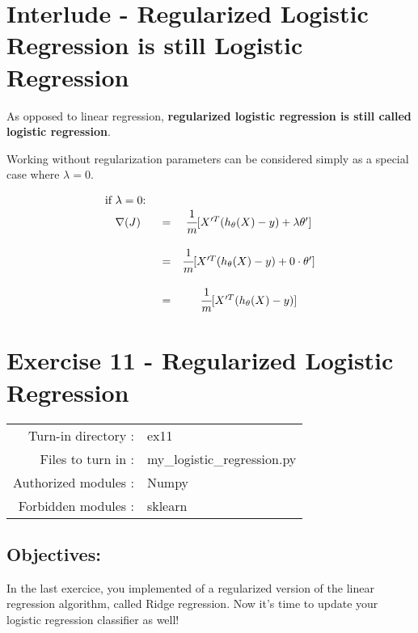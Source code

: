 \documentclass[]{article}
\begin{document}
\hypertarget{interlude---regularized-logistic-regression-is-still-logistic-regression-1}{%
\section{Interlude - Regularized Logistic Regression is still Logistic
Regression}\label{interlude---regularized-logistic-regression-is-still-logistic-regression-1}}

As opposed to linear regression, \textbf{regularized logistic regression
is still called logistic regression}.

Working without regularization parameters can be considered simply as a
special case where \(\lambda = 0\).

\large

\[
\begin{matrix}
\text{if } \lambda = 0 \text{: }\\
\nabla(J) & = & \cfrac{1}{m} [X'^T(h_\theta(X) - y) + \lambda \theta'] \\
\\
& = & \cfrac{1}{m} [X'^T(h_\theta(X) - y) + 0 \cdot \theta'] \\
\\
& = & \cfrac{1}{m} [X'^T(h_\theta(X) - y)]    
\end{matrix}
\] \normalsize \clearpage

\hypertarget{exercise-11---regularized-logistic-regression-1}{%
\section{Exercise 11 - Regularized Logistic
Regression}\label{exercise-11---regularized-logistic-regression-1}}

\begin{longtable}[]{@{}rl@{}}
\toprule
\endhead
Turn-in directory : & ex11\tabularnewline
Files to turn in : & my\_logistic\_regression.py\tabularnewline
Authorized modules : & Numpy\tabularnewline
Forbidden modules : & sklearn\tabularnewline
\bottomrule
\end{longtable}

\hypertarget{objectives-10}{%
\subsection{Objectives:}\label{objectives-10}}

In the last exercice, you implemented of a regularized version of the
linear regression algorithm, called Ridge regression. Now it's time to
update your logistic regression classifier as well!
\end{document}
